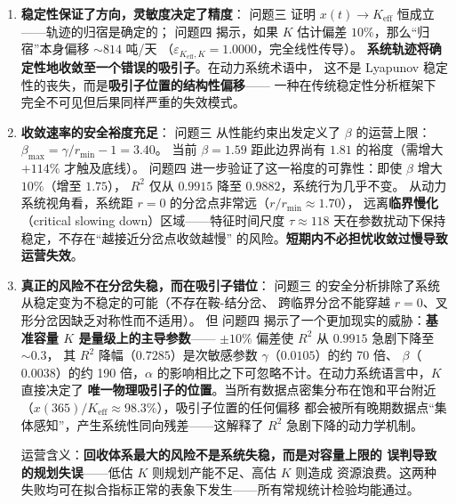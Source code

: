 \documentclass[12pt,a4paper]{ctexart}
\begin{document}
\begin{enumerate}
  \item \textbf{稳定性保证了方向，灵敏度决定了精度}：
        问题三 证明 $x(t) \to K_{\text{eff}}$ 恒成立——轨迹的归宿是确定的；
        问题四 揭示，如果 $K$ 估计偏差 $10\%$，那么``归宿''本身偏移 $\sim 814$ 吨/天
        （$\varepsilon_{K_{\text{eff}}, K} = 1.0000$，完全线性传导）。
        \textbf{系统轨迹将确定性地收敛至一个错误的吸引子}。在动力系统术语中，
        这不是 Lyapunov 稳定性的丧失，而是\textbf{吸引子位置的结构性偏移}——
        一种在传统稳定性分析框架下完全不可见但后果同样严重的失效模式。

  \item \textbf{收敛速率的安全裕度充足}：
        问题三 从性能约束出发定义了 $\beta$ 的运营上限：
        $\beta_{\max} = \gamma/r_{\min} - 1 = 3.40$。
        当前 $\beta = 1.59$ 距此边界尚有 $1.81$ 的裕度（需增大 $+114\%$ 才触及底线）。
        问题四 进一步验证了这一裕度的可靠性：即使 $\beta$ 增大 $10\%$（增至 $1.75$），
        $R^2$ 仅从 $0.9915$ 降至 $0.9882$，系统行为几乎不变。
        从动力系统视角看，系统距 $r = 0$ 的分岔点非常远（$r/r_{\min} \approx 1.70$），
        远离\textbf{临界慢化}（critical slowing down）区域——特征时间尺度
        $\tau \approx 118$ 天在参数扰动下保持稳定，不存在``越接近分岔点收敛越慢''
        的风险。\textbf{短期内不必担忧收敛过慢导致运营失效}。

  \item \textbf{真正的风险不在分岔失稳，而在吸引子错位}：
        问题三 的安全分析排除了系统从稳定变为不稳定的可能（不存在鞍-结分岔、
        跨临界分岔不能穿越 $r = 0$、叉形分岔因缺乏对称性而不适用）。
        但 问题四 揭示了一个更加现实的威胁：\textbf{基准容量 $K$ 是量级上的主导参数}——
        $\pm 10\%$ 偏差使 $R^2$ 从 $0.9915$ 急剧下降至 $\sim 0.3$，
        其 $R^2$ 降幅（$0.7285$）是次敏感参数 $\gamma$（$0.0105$）的约 70 倍、
        $\beta$（$0.0038$）的约 190 倍，$\alpha$ 的影响相比之下可忽略不计。在动力系统语言中，$K$ 直接决定了
        \textbf{唯一物理吸引子的位置}。当所有数据点密集分布在饱和平台附近
        （$x(365)/K_{\text{eff}} \approx 98.3\%$），吸引子位置的任何偏移
        都会被所有晚期数据点``集体感知''，产生系统性同向残差——这解释了
        $R^2$ 急剧下降的动力学机制。

        运营含义：\textbf{回收体系最大的风险不是系统失稳，而是对容量上限的
        误判导致的规划失误}——低估 $K$ 则规划产能不足、高估 $K$ 则造成
        资源浪费。这两种失败均可在拟合指标正常的表象下发生——所有常规统计检验均能通过。
\end{enumerate}
\end{document}
